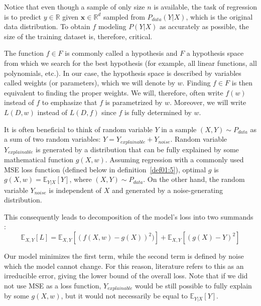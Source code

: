 Notice that even though a sample of only size $n$ is available, the task of regression is to predict $y \in \mathbb{R}$ given $\textbf{x} \in \mathbb{R}^d$ sampled from $P_{data}(Y|X)$, which is the original data distribution. To obtain $f$ modeling $P(Y|X)$ as accurately as possible, the size of the training dataset is, therefore, critical.

\begin{defn}\label{def01:4}
The function $f \in F$ is commonly called a hypothesis and $F$ a hypothesis space from which we search for the best hypothesis (for example, all linear functions, all polynomials, etc.). In our case, the hypothesis space is described by variables called weights (or parameters), which we will denote by $w$. Finding $f \in F$ is then equivalent to finding the proper weights. We will, therefore, often write $f(w)$ instead of $f$ to emphasize that $f$ is parametrized by $w$. Moreover, we will write $L(D, w)$ instead of $L(D, f)$ since $f$ is fully determined by $w$.
\end{defn}

It is often beneficial to think of random variable $Y$ in a sample $(X, Y) \sim P_{data}$ as a sum of two random variables: $Y = Y_{explainable} + Y_{noise}$. Random variable $Y_{explainable}$ is generated by a distribution that can be fully explained by some mathematical function $g(X, w)$. Assuming regression with a commonly used MSE loss function (defined below in definition~\ref{def01:5}), optimal $g$ is $g(X, w) = \mathbb{E}_{Y|X}[Y]$, where $(X, Y) \sim P_{data}$. On the other hand, the random variable $Y_{noise}$ is independent of $X$ and generated by a noise-generating distribution. 

This consequently leads to decomposition of the model’s loss into two summands \citep{bishop2006pattern}:
\begin{equation}
\mathbb{E}_{X, Y}[L] = 
\mathbb{E}_{X, Y}[(f(X, w) - g(X))^2)] + 
\mathbb{E}_{X, Y}[(g(X) - Y)^2]
\end{equation}

Our model minimizes the first term, while the second term is defined by noise which the model cannot change. For this reason, literature refers to this as an irreducible error, giving the lower bound of the overall loss. Note that if we did not use MSE as a loss function, $Y_{explainable}$ would be still possible to fully explain by some $g(X, w)$, but it would not necessarily be equal to $\mathbb{E}_{Y|X}[Y]$.

